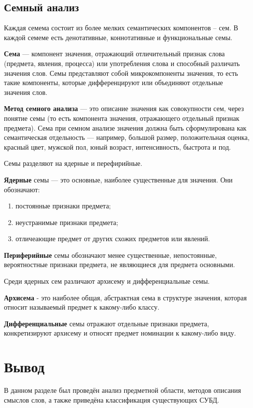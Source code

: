 \subsection{Семный анализ}

Каждая семема состоит из более мелких семантических компонентов – сем.
В каждой семеме есть денотативные, коннотативные и функциональные семы.

\textbf{Сема} --- компонент значения, отражающий отличительный признак слова (предмета, явления, процесса) или употребления слова и способный различать значения слов.
Семы представляют собой микрокомпоненты значения, то есть такие компоненты, которые дифференцируют или объединяют отдельные значения слов.

\textbf{Метод семного анализа} --- это описание значения как совокупности сем, через понятие семы (то есть компонента значения, отражающего отдельный признак предмета).
Сема при семном анализе значения должна быть сформулирована как семантическая отдельность --- например, большой размер, положительная оценка, красный цвет, мужской пол, юный возраст, интенсивность, быстрота и под.

Семы разделяют на ядерные и перефирийные.

\textbf{Ядерные} семы  --- это основные, наиболее существенные для значения. Они обозначают:
\begin{enumerate}[label=\arabic*.]
	\item постоянные признаки предмета;
	\item неустранимые признаки предмета;
	\item отличеающие предмет от других схожих предметов или явлений.
\end{enumerate}

\textbf{Периферийные} семы обозначают менее существенные, непостоянные, вероятностные признаки предмета, не являющиеся для предмета основными.

Среди ядерных сем различают архисему и дифференциальные семы.

\textbf{Архисема} - это наиболее общая, абстрактная сема в структуре значения, которая относит называемый предмет к какому-либо классу.

\textbf{Дифференциальные} семы отражают отдельные признаки предмета, конкретизируют архисему и относят предмет номинации к какому-либо виду.

\section*{Вывод}

В данном разделе был проведён анализ предметной области, методов описания смыслов слов, а также приведёна классификация существующих СУБД.